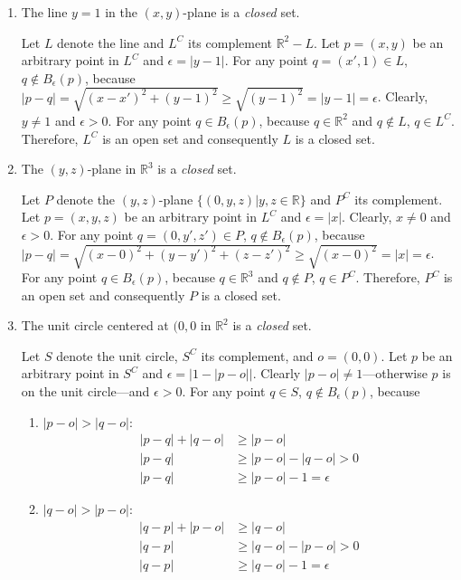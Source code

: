 \documentclass{homework}
\begin{document}
\begin{problem}{5}
\begin{enumerate}
\item The line $y = 1$ in the $(x, y)$-plane is a \emph{closed} set.

Let $L$ denote the line and $L^C$ its complement $\mathbb{R}^2 - L$. Let $p = (x, y)$ be an arbitrary point in $L^C$ and $\epsilon = |y - 1|$. For any point $q = (x', 1) \in L$, $q \notin B_{\epsilon}(p)$, because $|p - q| = \sqrt{(x - x')^2 + (y - 1)^2} \geq \sqrt{(y - 1)^2} = |y - 1| = \epsilon$. Clearly, $y \neq 1$ and $\epsilon > 0$. For any point $q \in B_{\epsilon}(p)$, because $q \in \mathbb{R}^2$ and $q \notin L$, $q \in L^C$. Therefore, $L^C$ is an open set and consequently $L$ is a closed set. \QED

\item The $(y, z)$-plane in $\mathbb{R}^3$ is a \emph{closed} set.

Let $P$ denote the $(y, z)$-plane $\{(0, y, z) | y, z \in \mathbb{R}\}$ and $P^C$ its complement. Let $p = (x, y, z)$ be an arbitrary point in $L^C$ and $\epsilon = |x|$. Clearly, $x \neq 0$ and $\epsilon > 0$. For any point $q = (0, y', z') \in P$, $q \notin B_{\epsilon}(p)$, because $|p - q| = \sqrt{(x - 0)^2 + (y - y')^2 + (z - z')^2} \geq \sqrt{(x - 0)^2} = |x| = \epsilon$. For any point $q \in B_{\epsilon}(p)$, because $q \in \mathbb{R}^3$ and $q \notin P$, $q \in P^C$. Therefore, $P^C$ is an open set and consequently $P$ is a closed set. \QED

\item The unit circle centered at $(0, 0$ in $\mathbb{R}^2$ is a \emph{closed} set.

Let $S$ denote the unit circle, $S^C$ its complement, and $o = (0, 0)$. Let $p$ be an arbitrary point in $S^C$ and $\epsilon = |1 - |p - o||$. Clearly $|p - o| \neq 1$---otherwise $p$ is on the unit circle---and $\epsilon > 0$. For any point $q \in S$, $q \notin B_{\epsilon}(p)$, because
\begin{enumerate}
\item $|p - o| > |q - o|$:
\begin{align*}
  |p - q| + |q - o| & \geq |p - o| \\
  |p - q| & \geq |p - o| - |q - o| > 0 \\
  |p - q| & \geq |p - o| - 1 = \epsilon
\end{align*}

\item $|q - o| > |p - o|$:
\begin{align*}
  |q - p| + |p - o| & \geq |q - o| \\
  |q - p| & \geq |q - o| - |p - o| > 0 \\
  |q - p| & \geq |q - o| - 1 = \epsilon
\end{align*}
\end{enumerate}


\end{enumerate}
\end{problem}
\end{document}
